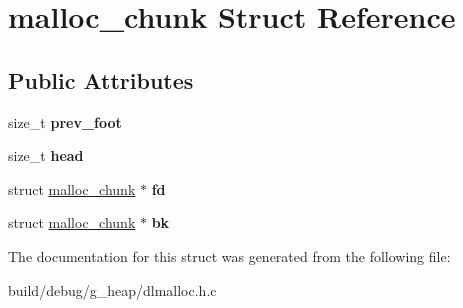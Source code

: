 \hypertarget{structmalloc__chunk}{\section{malloc\-\_\-chunk Struct Reference}
\label{structmalloc__chunk}
}
\subsection*{Public Attributes}
\begin{DoxyCompactItemize}
\item 
\hypertarget{structmalloc__chunk_a2cbb92874183d7a4b42e150b7d7ec1f9}{size\-\_\-t {\bfseries prev\-\_\-foot}}\label{structmalloc__chunk_a2cbb92874183d7a4b42e150b7d7ec1f9}

\item 
\hypertarget{structmalloc__chunk_a7383bb525d34ca811283c927086205bc}{size\-\_\-t {\bfseries head}}\label{structmalloc__chunk_a7383bb525d34ca811283c927086205bc}

\item 
\hypertarget{structmalloc__chunk_a3bf7a41ce24baa8f17a5a4d13abfdef4}{struct \hyperlink{structmalloc__chunk}{malloc\-\_\-chunk} $\ast$ {\bfseries fd}}\label{structmalloc__chunk_a3bf7a41ce24baa8f17a5a4d13abfdef4}

\item 
\hypertarget{structmalloc__chunk_a1c0148642730c23c73bee9043deaf398}{struct \hyperlink{structmalloc__chunk}{malloc\-\_\-chunk} $\ast$ {\bfseries bk}}\label{structmalloc__chunk_a1c0148642730c23c73bee9043deaf398}

\end{DoxyCompactItemize}


The documentation for this struct was generated from the following file\-:\begin{DoxyCompactItemize}
\item 
build/debug/g\-\_\-heap/dlmalloc.\-h.\-c\end{DoxyCompactItemize}
